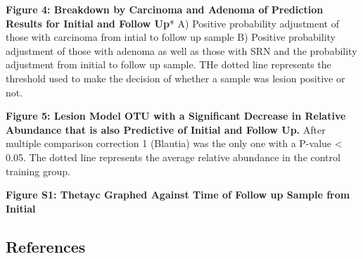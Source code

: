 \documentclass[12pt,]{article}
\begin{document}
\textbf{Figure 4: Breakdown by Carcinoma and Adenoma of Prediction
Results for Initial and Follow Up}* A) Positive probability adjustment
of those with carcinoma from intial to follow up sample B) Positive
probability adjustment of those with adenoma as well as those with SRN
and the probability adjustment from initial to follow up sample. THe
dotted line represents the threshold used to make the decision of
whether a sample was lesion positive or not.

\textbf{Figure 5: Lesion Model OTU with a Significant Decrease in
Relative Abundance that is also Predictive of Initial and Follow Up.}
After multiple comparison correction 1 (Blautia) was the only one with a
P-value \textless{} 0.05. The dotted line represents the average
relative abundance in the control training group.

\newpage

\textbf{Figure S1: Thetayc Graphed Against Time of Follow up Sample from
Initial}

\newpage

\subsection{References}\label{references}
\end{document}
